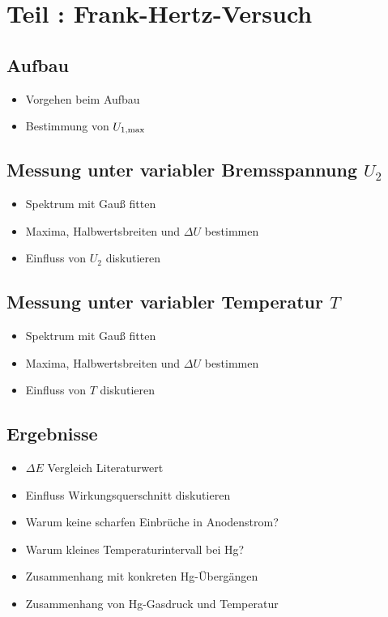 \section{Teil : Frank-Hertz-Versuch}

\subsection{Aufbau}
    \begin{itemize}
        \item Vorgehen beim Aufbau
        \item Bestimmung von $U_{\text{1,max}}$
    \end{itemize}

\subsection{Messung unter variabler Bremsspannung $U_2$}
    \begin{itemize}
        \item Spektrum mit Gauß fitten
        \item Maxima, Halbwertsbreiten und $\Delta U$ bestimmen
        \item Einfluss von $U_2$ diskutieren
    \end{itemize}
    
\subsection{Messung unter variabler Temperatur $T$}
    \begin{itemize}
        \item Spektrum mit Gauß fitten
        \item Maxima, Halbwertsbreiten und $\Delta U$ bestimmen
        \item Einfluss von $T$ diskutieren
    \end{itemize}

\subsection{Ergebnisse}
    \begin{itemize}
        \item $\Delta E$ Vergleich Literaturwert
        \item Einfluss Wirkungsquerschnitt diskutieren
        \item Warum keine scharfen Einbrüche in Anodenstrom?
        \item Warum kleines Temperaturintervall bei Hg?
        \item Zusammenhang mit konkreten Hg-Übergängen
        \item Zusammenhang von Hg-Gasdruck und Temperatur
    \end{itemize}



